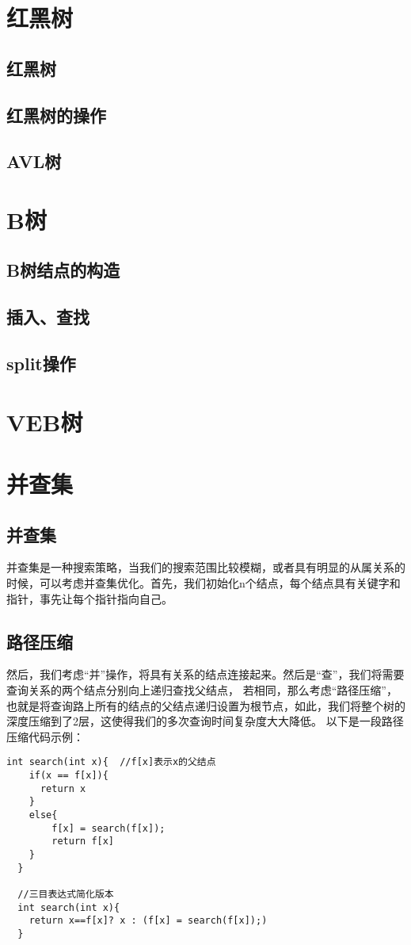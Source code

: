 \documentclass[12pt,a4paper,UTF16]{ctexbook}
\theoremstyle{plain}
\begin{document}
\section{红黑树}
\subsection{红黑树}
\subsection{红黑树的操作}
\subsection{AVL树}
\section{B树}
\subsection{B树结点的构造}
\subsection{插入、查找}
\subsection{split操作}
\section{VEB树}

\section{并查集}
\subsection{并查集}
并查集是一种搜索策略，当我们的搜索范围比较模糊，或者具有明显的从属关系的时候，可以考虑并查集优化。首先，我们初始化n个结点，每个结点具有关键字和指针，事先让每个指针指向自己。
\subsection{路径压缩}
然后，我们考虑“并”操作，将具有关系的结点连接起来。然后是“查”，我们将需要查询关系的两个结点分别向上递归查找父结点，
若相同，那么考虑“路径压缩”，也就是将查询路上所有的结点的父结点递归设置为根节点，如此，我们将整个树的深度压缩到了2层，这使得我们的多次查询时间复杂度大大降低。
以下是一段路径压缩代码示例：
\begin{lstlisting}[basicstyle=\ttfamily]
  int search(int x){  //f[x]表示x的父结点
    if(x == f[x]){
      return x
    }
    else{
        f[x] = search(f[x]);
        return f[x]
    }
  }
      
  //三目表达式简化版本
  int search(int x){
    return x==f[x]? x : (f[x] = search(f[x]);)
  }
\end{lstlisting}
\end{document}
